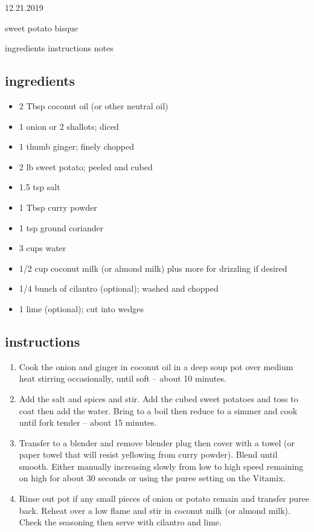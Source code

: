 \documentclass[]{book}
\providecommand{\tightlist}{%
  \setlength{\itemsep}{0pt}\setlength{\parskip}{0pt}}
\begin{document}
12.21.2019

sweet potato bisque

ingredients \textbar{}
instructions \textbar{}
notes

\hypertarget{ingredients-18}{%
\subsection{ingredients}\label{ingredients-18}}

\begin{itemize}
\tightlist
\item
  2 Tbsp coconut oil (or other neutral oil)
\item
  1 onion or 2 shallots; diced
\item
  1 thumb ginger; finely chopped
\item
  2 lb sweet potato; peeled and cubed
\item
  1.5 tsp salt
\item
  1 Tbsp curry powder
\item
  1 tsp ground coriander
\item
  3 cups water
\item
  1/2 cup coconut milk (or almond milk) plus more for drizzling if desired
\item
  1/4 bunch of cilantro (optional); washed and chopped
\item
  1 lime (optional); cut into wedges
\end{itemize}

\hypertarget{instructions-18}{%
\subsection{instructions}\label{instructions-18}}

\begin{enumerate}
\def\labelenumi{\arabic{enumi}.}
\tightlist
\item
  Cook the onion and ginger in coconut oil in a deep soup pot over medium heat stirring occasionally, until soft -- about
  10 minutes.
\item
  Add the salt and spices and stir. Add the cubed sweet potatoes and toss to coat then add the water. Bring to a boil
  then reduce to a simmer and cook until fork tender -- about 15 minutes.
\item
  Transfer to a blender and remove blender plug then cover with a towel (or paper towel that will resist yellowing
  from curry powder). Blend until smooth. Either manually increasing slowly from low to high speed remaining on high for
  about 30 seconds or using the puree setting on the Vitamix.
\item
  Rinse out pot if any small pieces of onion or potato remain and transfer puree back. Reheat over a low flame
  and stir in coconut milk (or almond milk). Check the seasoning then serve with cilantro and lime.
\end{enumerate}
\end{document}
